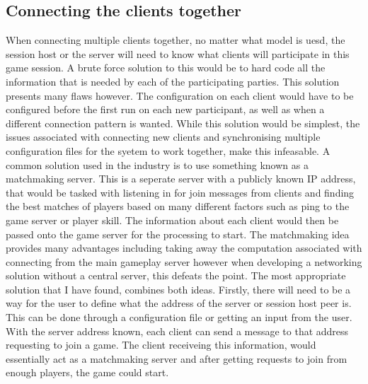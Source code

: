 \subsection{Connecting the clients together}
When connecting multiple clients together, no matter what model is uesd, the session host or the server will need to know what clients will participate in this game session. A brute force solution to this would be to hard code all the information that is needed by each of the participating parties. This solution presents many flaws however. The configuration on each client would have to be configured before the first run on each new participant, as well as when a different connection pattern is wanted. While this solution would be simplest, the issues associated with connecting new clients and synchronising multiple configuration files for the syetem to work together, make this infeasable.
A common solution used in the industry is to use something known as a matchmaking server. This is a seperate server with a publicly known IP address, that would be tasked with listening in for join messages from clients and finding the best matches of players based on many different factors such as ping to the game server or player skill. The information about each client would then be passed onto the game server for the processing to start. The matchmaking idea provides many advantages including taking away the computation associated with connecting from the main gameplay server however when developing a networking solution without a central server, this defeats the point.
The most appropriate solution that I have found, combines both ideas. Firstly, there will need to be a way for the user to define what the address of the server or session host peer is. This can be done through a configuration file or getting an input from the user. With the server address known, each client can send a message to that address requesting to join a game. The client receiveing this information, would essentially act as a matchmaking server and after getting requests to join from enough players, the game could start.

